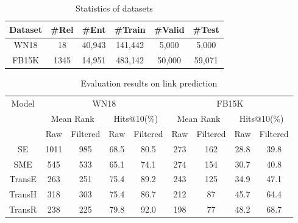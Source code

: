 \documentclass[11pt,a4paper]{article}
\begin{document}
\begin{table}[H]\small
\centering \caption{Statistics of datasets}
\begin{tabular}{c|ccccc}
\hline
Dataset & \#Rel & \#Ent & \#Train & \#Valid & \#Test \\
\hline
WN18 & 18 & 40,943 & 141,442 & 5,000 & 5,000 \\
FB15K & 1345 & 14,951 & 483,142 & 50,000 & 59,071 \\
\hline
\end{tabular}
\end{table}





\begin{table*}[t]
\centering \caption{Evaluation results on link prediction}
\begin{tabular}{|c|c|c|c|c|c|c|c|c|}
\hline
\multicolumn{1}{|c|}{\multirow{3}{*}{Model}} & \multicolumn{4}{|c|}{WN18}                                        & \multicolumn{4}{|c|}{FB15K}                                       \\
\cline{2-9}
\multicolumn{1}{|c|}{}                       & \multicolumn{2}{|c|}{Mean Rank} & \multicolumn{2}{|c|}{Hits@10(\%)} & \multicolumn{2}{|c|}{Mean Rank} & \multicolumn{2}{|c|}{Hits@10(\%)} \\
\cline{2-9}
\multicolumn{1}{|c|}{}                       & Raw         & Filtered        & Raw          & Filtered         & Raw         & Filtered        & Raw          & Filtered         \\
\hline
SE                                         & 1011        & 985             & 68.5         & 80.5             & 273         & 162             & 28.8         & 39.8             \\
SME                                        & 545         & 533             & 65.1         & 74.1             & 274         & 154             & 30.7         & 40.8             \\
TransE                                     & 263         & 251             & 75.4         & 89.2             & 243         & 125             & 34.9         & 47.1             \\
TransH                                     & 318         & 303             & 75.4         & 86.7             & 212         & 87              & 45.7         & 64.4             \\
TransR                                     & 238         & 225             & 79.8         & 92.0               & 198         & 77              & 48.2         & 68.7             \\

\end{tabular}
\end{table*}
\end{document}

